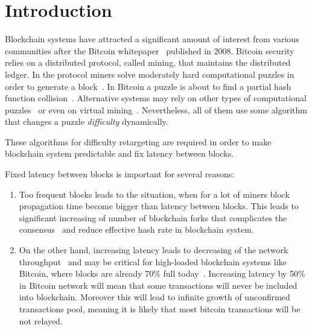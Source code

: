 \documentclass[number,preprint,review]{elsarticle}
\begin{document}
\section{Introduction}
\label{sec:intro}

Blockchain systems have attracted a significant amount of interest from various communities after the Bitcoin whitepaper~\cite{Nakamoto2008} published in 2008.
Bitcoin security relies on a distributed protocol, called mining, that maintains the distributed ledger.
In the protocol miners solve moderately hard computational puzzles in order to generate a block~\cite{}. In Bitcoin a puzzle is about to find a partial hash function collision~\cite{}.
Alternative systems may rely on other types of computational puzzles~\cite{??} or even on virtual mining~\cite{??}.
Nevertheless, all of them use some algorithm that changes a puzzle \textit{difficulty} dynamically.

These algorithms for difficulty retargeting are required in order to make blockchain system predictable and fix latency between blocks.

Fixed latency between blocks is important for several reasons:

\begin{enumerate}
\item{Too frequent blocks leads to the situation, when for a lot of miners block propagation time become bigger than latency between blocks. This leads to significant increasing of number of blockchain forks that complicates the consensus~\cite{decker2013information} and reduce effective hash rate in blockchain system.}

\item{On the other hand, increasing latency leads to decreasing of the network throughput~\cite{miller2016} and may be critical for high-loaded blockchain systems like Bitcoin, where blocks are already 70\% full today~\cite{armstrong2016}.
Increasing latency by 50\% in Bitcoin network will mean that some transactions will never be included into blockchain.
Moreover this will lead to infinite growth of unconfirmed transactions pool, meaning it is likely that most bitcoin transactions will be not relayed.}
\end{enumerate}
\end{document}
